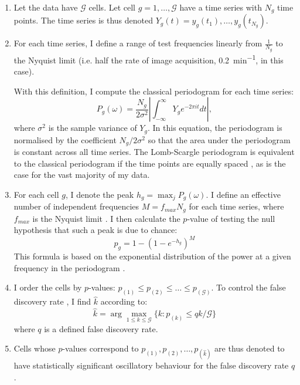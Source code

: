 \begin{enumerate}
\item Let the data have $\mathcal{G}$ cells.
Let cell $g = 1, \dots{}, \mathcal{G}$ have a time series with $N_{g}$ time points.
The time series is thus denoted $Y_{g}(t) = y_{g}(t_{1}), \dots{}, y_{g}(t_{N_{g}})$.
\item For each time series, I define a range of test frequencies linearly from $\frac{1}{N_{g}}$ to the Nyquist limit (i.e. half the rate of image acquisition, \SI{0.2}{\minute^{-1}}, in this case).

With this definition, I compute the classical periodogram for each time series:
  \begin{equation}
    P_{g}(\omega) = \frac{N_{g}}{2\sigma^{2}} \left|\int_{-\infty}^{\infty} Y_{g} e^{-2\pi it}dt \right|, %
    \label{eq:normalised-periodogram-ar}
  \end{equation}
        where $\sigma^{2}$ is the sample variance of $Y_{g}$.
        In this equation, the periodogram is normalised by the coefficient $N_{g}/2\sigma^{2}$ so that the area under the periodogram is constant across all time series.
        The Lomb-Scargle periodogram is equivalent to the classical periodogram if the time points are equally spaced \parencite{lombLeastsquaresFrequencyAnalysis1976}, as is the case for the vast majority of my data.
\item For each cell $g$, I denote the peak $h_{g} = \max_{j}P_{g}(\omega)$.
I define an effective number of independent frequencies $M = f_{max}N_{g}$ for each time series, where $f_{max}$ is the Nyquist limit \parencite{vanderplasUnderstandingLombScarglePeriodogram2018}.
  I then calculate the $p$-value of testing the null hypothesis that such a peak is due to chance:
  \begin{equation}
    p_{g} = 1 - (1 - e^{-h_{g}})^M
    \label{eq:lsp-pval}
  \end{equation}
  This formula is based on the exponential distribution of the power at a given frequency in the periodogram \parencite{scargleStudiesAstronomicalTime1982}.
\item I order the cells by $p$-values: $p_{(1)} \leq p_{(2)} \leq \dots \leq p_{(\mathcal{G})}$.
  To control the false discovery rate \parencite{benjaminiControllingFalseDiscovery1995}, I find $\hat{k}$ according to:
  \begin{equation}
    \hat{k} = \arg\max_{1 \leq k \leq \mathcal{G}}\{k : p_{(k)} \leq qk/\mathcal{G}\}
    \label{eq:lsp-khat}
  \end{equation}
  where $q$ is a defined false discovery rate.
\item Cells whose $p$-values correspond to $p_{(1)}, p_{(2)}, \dots, p_{(\hat{k})}$ are thus denoted to have statistically significant oscillatory behaviour for the false discovery rate $q$.
\end{enumerate}

